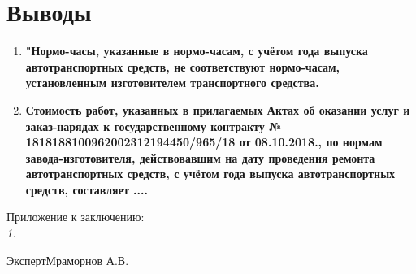 \section{Выводы}


\begin{enumerate}
	\item 
	\textbf{"Нормо-часы, указанные в  нормо-часам, с учётом года выпуска автотранспортных средств, не соответствуют нормо-часам, установленным   изготовителем транспортного средства.}
	\item 
	\textbf{Стоимость работ, указанных в прилагаемых Актах об оказании услуг и заказ-нарядах к государственному контракту  № 1818188100962002312194450/965/18 от 08.10.2018., по нормам завода-изготовителя, действовавшим на дату проведения ремонта автотранспортных средств, с учётом года выпуска автотранспортных средств, составляет ....}
\end{enumerate}






\vspace{15mm}
\relax
Приложение к заключению:\\
\textit{
	1.
	   }

\vspace{20mm}

{Эксперт}\hfill           {Мраморнов А.В.}

%
%
